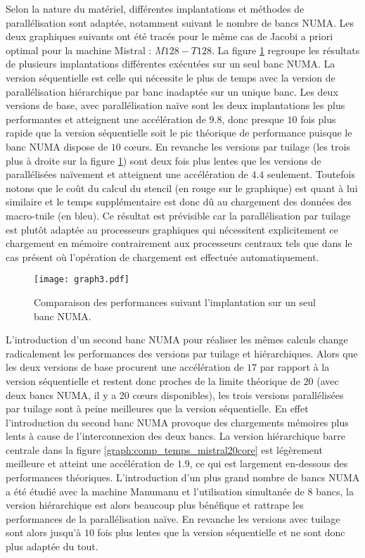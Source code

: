 Selon la nature du matériel, différentes implantations et méthodes de parallélisation sont adaptée, notamment suivant le nombre de bancs NUMA. Les deux graphiques suivants ont été tracés pour le même cas de Jacobi a priori optimal pour la machine \textsf{Mistral} : $M128-T128$. La figure \ref{graph:comp_temps_mistral10core} regroupe les résultats de plusieurs implantations différentes exécutées sur un seul banc NUMA. La version séquentielle est celle qui nécessite le plus de temps avec la version de parallélisation hiérarchique par banc inadaptée sur un unique banc. Les deux versions de base, avec parallélisation naïve sont les deux implantations les plus performantes et atteignent une accélération de $9.8$, donc presque $10$ fois plus rapide que la version séquentielle soit le pic théorique de performance puisque le banc NUMA dispose de $10$ cœurs. En revanche les versions par tuilage (les trois plus à droite sur la figure \ref{graph:comp_temps_mistral10core}) sont deux fois plus lentes que les versions de parallélisées naïvement et atteignent une accélération de $4.4$ seulement. Toutefois notons que le coût du calcul du stencil (en rouge sur le graphique) est quant à lui similaire et le temps supplémentaire est donc dû au chargement des données des macro-tuile (en bleu). Ce résultat est prévisible car la parallélisation par tuilage est plutôt adaptée au processeurs graphiques qui nécessitent explicitement ce chargement en mémoire contrairement aux processeurs centraux tels que dans le cas présent où l'opération de chargement est effectuée automatiquement.

\begin{figure}[!h]
  \caption{Comparaison des performances suivant l'implantation sur un seul banc NUMA.}
  \label{graph:comp_temps_mistral10core}
  \texttt{[image: graph3.pdf]}
\end{figure}

L'introduction d'un second banc NUMA pour réaliser les mêmes calculs change radicalement les performances des versions par tuilage et hiérarchiques. Alors que les deux versions de base procurent une accélération de $17$ par rapport à la version séquentielle et restent donc proches de la limite théorique de $20$ (avec deux bancs NUMA, il y a $20$ cœurs disponibles), les trois versions parallélisées par tuilage sont à peine meilleures que la version séquentielle. En effet l'introduction du second banc NUMA provoque des chargements mémoires plus lents à cause de l'interconnexion des deux bancs. La version hiérarchique barre centrale dans la figure \ref{graph:comp_temps_mistral20core} est légèrement meilleure et atteint une accélération de $1.9$, ce qui est largement en-dessous des performances théoriques. L'introduction d'un plus grand nombre de bancs NUMA a été étudié avec la machine \textsf{Manumanu} et l'utilisation simultanée de $8$ bancs, la version hiérarchique est alors beaucoup plus bénéfique et rattrape les performances de la parallélisation naïve. En revanche les versions avec tuilage sont alors jusqu'à $10$ fois plus lentes que la version séquentielle et ne sont donc plus adaptée du tout.

